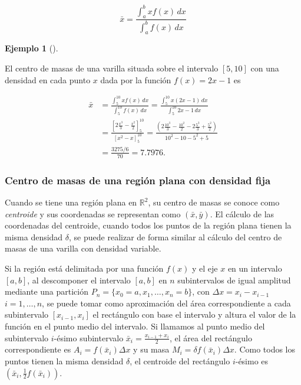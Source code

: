 \documentclass[
  a4paper,
]{scrreport}
\theoremstyle{definition}
\theoremstyle{definition}
\newtheorem{example}{Ejemplo}[chapter]
\theoremstyle{definition}
\theoremstyle{plain}
\theoremstyle{plain}
\theoremstyle{plain}
\theoremstyle{remark}
\begin{document}
\[
\bar x = \frac{\int_a^b xf(x)\,dx}{\int_a^b f(x)\,dx}
\]

\begin{example}[]\protect\hypertarget{exm-centro-masas}{}\label{exm-centro-masas}

El centro de masas de una varilla situada sobre el intervalo \([5, 10]\)
con una densidad en cada punto \(x\) dada por la función \(f(x)=2x-1\)
es

\begin{align*}
\bar x 
&= \frac{\int_5^{10} xf(x)\,dx}{\int_5^{10} f(x)\,dx} 
= \frac{\int_5^{10} x(2x-1)\,dx}{\int_5^{10} 2x-1\,dx} \\
&= \frac{\left[2\frac{x^3}{3}-\frac{x^2}{2}\right]_5^{10}}{[x^2-x]_5^{10}}
= \frac{\left(2\frac{10^3}{3}-\frac{10^2}{2}-2\frac{5^3}{3}+\frac{5^2}{2}\right)}{10^2-10-5^2+5} \\
&= \frac{3275/6}{70} 
= 7.7976.
\end{align*}

\end{example}

\subsubsection{Centro de masas de una región plana con densidad
fija}\label{sec-centro-masas-region-plana-densidad-constante}

Cuando se tiene una región plana en \(\mathbb{R}^2\), su centro de masas
se conoce como \emph{centroide} y sus coordenadas se representan como
\((\bar x, \bar y)\). El cálculo de las coordenadas del centroide,
cuando todos los puntos de la región plana tienen la misma densidad
\(\delta\), se puede realizar de forma similar al cálculo del centro de
masas de una varilla con densidad variable.

Si la región está delimitada por una función \(f(x)\) y el eje \(x\) en
un intervalo \([a,b]\), al descomponer el intervalo \([a,b]\) en \(n\)
subintervalos de igual amplitud mediante una partición
\(P_n=\{x_0=a, x_1, \ldots, x_n=b\}\), con \(\Delta x=x_i-x_{i-1}\)
\(i=1, \ldots, n\), se puede tomar como aproximación del área
correspondiente a cada subintervalo \([x_{i-1},x_i]\) el rectángulo con
base el intervalo y altura el valor de la función en el punto medio del
intervalo. Si llamamos al punto medio del subintervalo \(i\)-ésimo
subintervalo \(\bar x_i=\frac{x_{i-1}+x_i}{2}\), el área del rectángulo
correspondiente es \(A_i = f(\bar x_i)\Delta x\) y su masa
\(M_i = \delta f(\bar x_i)\Delta x\). Como todos los puntos tienen la
misma densidad \(\delta\), el centroide del rectángulo \(i\)-ésimo es
\((\bar x_i, \frac{1}{2}f(\bar x_i))\).
\end{document}
